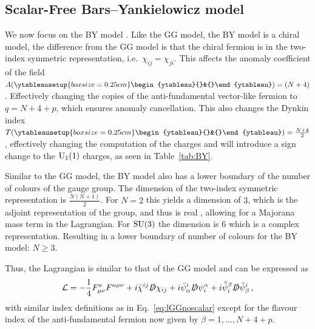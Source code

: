 \subsection{Scalar-Free Bars--Yankielowicz model}
We now focus on the BY model \cite{Bars:1981se}. Like the GG model, the BY model is a chiral model, the difference from the GG model is that the chiral fermion is in the two-index symmetric representation, i.e.\ $\chi_{ij}=\chi_{ji}$. This affects the anomaly coefficient of the field $A(\ytableausetup{boxsize=0.25cm}\begin{ytableau}{}&{}\end{ytableau})=(N+4)$. Effectively changing the copies of the anti-fundamental vector-like fermion to $q=N+4+p$, which ensures anomaly cancellation. This also changes the Dynkin index $T(\ytableausetup{boxsize=0.25cm}\begin{ytableau}{}&{}\end{ytableau})=\frac{N+4}{2}$, effectively changing the computation of the charges and will introduce a sign change to the $\mathrm{U}_1(1)$ charges, as seen in Table~\ref{tab:BY}.

Similar to the GG model, the BY model also has a lower boundary of the number of colours of the gauge group. The dimension of the two-index symmetric representation is $\frac{N(N+1)}{2}$. For $N=2$ this yields a dimension of $3$, which is the adjoint representation of the group, and thus is real \cite{Georgi:1999wka}, allowing for a Majorana mass term in the Lagrangian. For $\mathrm{SU}(3)$ the dimension is $6$ which is a complex representation. Resulting in a lower boundary of number of colours for the BY model: $N\ge3$. 

Thus, the Lagrangian is similar to that of the GG model and can be expressed as
\begin{align}\mathcal{L}= -\frac{1}{4} F_{\mu\nu}^a F^{a\mu\nu}+ i \bar{\chi}^{ij} \slashed{D} \chi_{ij} 
    + i \bar{\psi}^i_\alpha \slashed{D} \psi_i^\alpha 
    + i \bar{\tilde{\psi}}_i^\beta \slashed{D} \tilde{\psi}^i_\beta
    \,,
\end{align}
with similar index definitions as in Eq.~\eqref{eq:lGGnoscalar} except for the flavour index of the anti-fundamental fermion now given by $\beta=1,\dots, N+4+p$.

